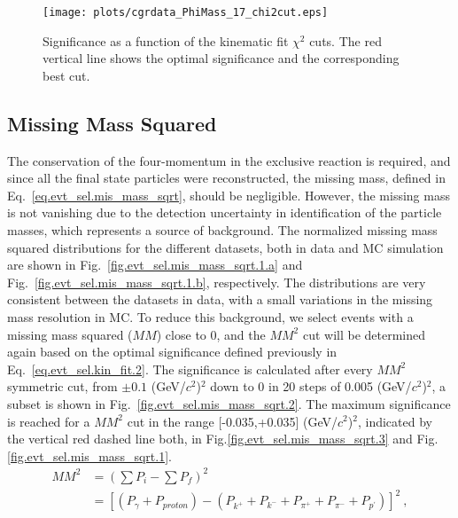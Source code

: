 \begin{figure}[H]
    \centering
        \texttt{[image: plots/cgrdata\_PhiMass\_17\_chi2cut.eps]}
        \caption{Significance as a function of the kinematic fit $\chi^{2}$ cuts. The red vertical line shows the optimal significance and the corresponding best cut.}
        \label{fig.evt_sel.kin_fit.3}
\end{figure}

\subsection{Missing Mass Squared}
\label{sec.evt_sel.mis_mass_sqrt}

The conservation of the four-momentum in the exclusive reaction is required, and since all the final state particles were reconstructed, the missing mass, defined in Eq.~\ref{eq.evt_sel.mis_mass_sqrt}, should be negligible. However, the missing mass is not vanishing due to the detection uncertainty in identification of the particle masses, which represents a source of background. The normalized missing mass squared distributions for the different datasets, both in data and MC simulation are shown in Fig.~\ref{fig.evt_sel.mis_mass_sqrt.1.a} and Fig.~\ref{fig.evt_sel.mis_mass_sqrt.1.b}, respectively. The distributions are very consistent between the datasets in data, with a small variations in the missing mass resolution in MC. To reduce this background, we select events with a missing mass squared ($MM$) close to 0, and the $MM^{2}$ cut will be determined again based on the optimal significance defined previously in Eq.~\ref{eq.evt_sel.kin_fit.2}. The significance is calculated after every $MM^{2}$ symmetric cut, from $\pm 0.1$ (GeV/$c^2$)$^2$ down to 0 in 20 steps of 0.005 (GeV/$c^2$)$^2$, a subset is shown in Fig.~\ref{fig.evt_sel.mis_mass_sqrt.2}. The maximum significance is reached for a $MM^{2}$ cut in the range [-0.035,+0.035] (GeV/$c^2$)$^2$, indicated by the vertical red dashed line both, in Fig.\ref{fig.evt_sel.mis_mass_sqrt.3} and Fig.\ref{fig.evt_sel.mis_mass_sqrt.1}.
\begin{equation}
    \label{eq.evt_sel.mis_mass_sqrt}
    \begin{aligned}
        MM^2 &= \left(\sum P_{i} - \sum P_{f}\right)^2 \\
             &= [(P_{\gamma} + P_{proton}) - (P_{k^+} + P_{k^-} + P_{\pi^+} + P_{\pi^-} + P_{p^{\prime}})]^2~,
    \end{aligned}    
\end{equation}

